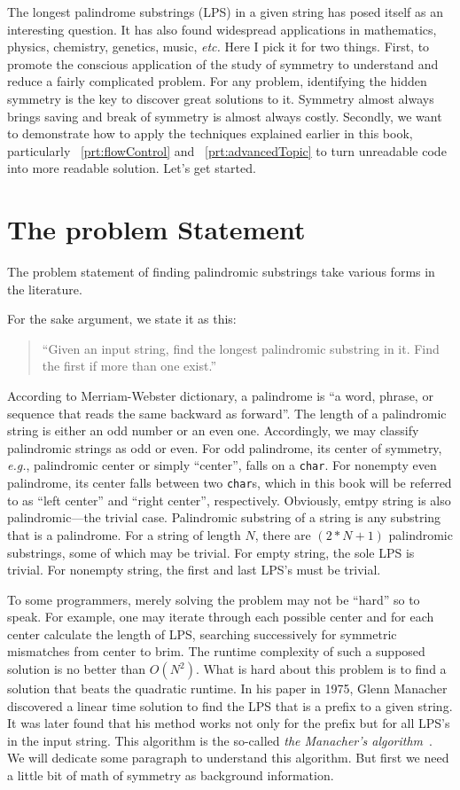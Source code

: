 \documentclass[oneside,11pt]{book}
\theoremstyle{definition}
\theoremstyle{remark}
\newcommand{\code}[1]{\mbox{\lstinline{#1}}}
\begin{document}
The longest palindrome substrings (LPS) in a given string has posed itself as an interesting
question.
It has also found widespread applications in mathematics, physics, chemistry, genetics, music,
\textit{etc.}
Here I pick it for two things.
First, to promote the conscious application of the study of symmetry to
understand and reduce a fairly complicated problem.
For any problem, identifying the hidden symmetry is the key to discover great
solutions to it.
Symmetry almost always brings saving and break of symmetry is almost always costly.
Secondly, we want to demonstrate how to apply the techniques explained earlier in this book,
particularly ~\autoref{prt:flowControl} and ~\autoref{prt:advancedTopic} to turn unreadable code
into more readable solution.
Let's get started.


\section{The problem Statement}\label{sec:lps-statement}

The problem statement of finding palindromic substrings take various forms in the literature.

For the sake argument, we state it as this:
\begin{quote}
    ``Given an input string, find the longest palindromic substring in it.
    Find the first if more than one exist.''
\end{quote}
According to Merriam-Webster dictionary, a palindrome is ``a word, phrase, or sequence that reads
the same backward as forward''.
The length of a palindromic string is either an odd number or an even one.
Accordingly, we may classify palindromic strings as odd or even.
For odd palindrome, its center of symmetry, \textit{e.g.}, palindromic center
or simply ``center'', falls on a \code{char}.
For nonempty even palindrome, its center falls between two \code{char}s, which in this book
will be referred to as ``left center'' and ``right center'', respectively.
Obviously, emtpy string is also palindromic---the trivial case.
Palindromic substring of a string is any substring that is a palindrome.
For a string of length $N$, there are $(2 * N + 1)$ palindromic substrings, some of which may be
trivial.
For empty string, the sole LPS is trivial.
For nonempty string, the first and last LPS's must be trivial.


To some programmers, merely solving the problem may not be ``hard'' so to speak.
For example, one may iterate through each possible center and for each center calculate the
length of LPS, searching successively for symmetric mismatches from center to brim.
The runtime complexity of such a supposed solution is no better than $O(N^2)$.
What is hard about this problem is to find a solution that beats the quadratic runtime.
In his paper in 1975, Glenn Manacher discovered a linear time solution to find the LPS that is a
prefix to a given string.
It was later found that his method works not only for the prefix but for all LPS's in the input
string.
This algorithm is the so-called \textit{the Manacher's algorithm}~\cite{Manacher:1975}.
We will dedicate some paragraph to understand this algorithm.
But first we need a little bit of math of symmetry as background information.
\end{document}
